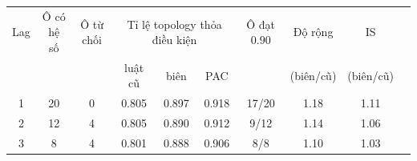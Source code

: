 \begin{tabular}{cccccccccc}
\toprule
Lag & Ô có hệ số & Ô từ chối & \multicolumn{3}{c}{Tỉ lệ topology thỏa điều kiện} & Ô đạt $0.90$ & Độ rộng & IS\\
 & & & luật cũ & biên & PAC & & (biên/cũ) & (biên/cũ)\\
\midrule
1 & 20 & 0 & 0.805 & 0.897 & 0.918 & 17/20 & 1.18 & 1.11  \\
2 & 12 & 4 & 0.805 & 0.890 & 0.912 & 9/12 & 1.14 & 1.06  \\
3 & 8 & 4 & 0.801 & 0.888 & 0.906 & 8/8 & 1.10 & 1.03 \\
\bottomrule
\end{tabular}
